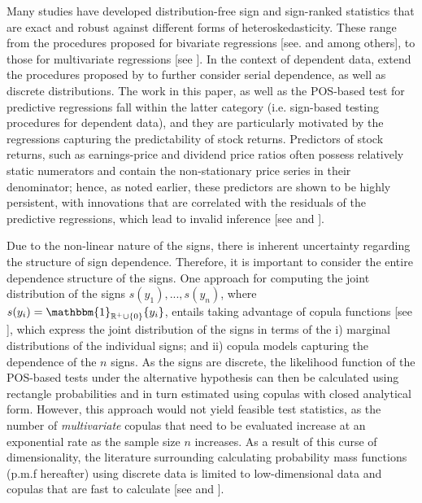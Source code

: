 \documentclass[harvard,11pt]{article}
\newcommand{\R}{\mathbb{R}}
\begin{document}
Many studies have developed distribution-free sign and sign-ranked statistics that are exact and robust against different forms of heteroskedasticity. These range from the procedures proposed for bivariate regressions [see. \citet{campbell1991over, dufour1995exact, campbell1997exact} and \citet{luger2003exact} among others], to those for multivariate regressions [see \citet{dufour2010exact}]. In the context of dependent data, \citet{coudin2009finite} extend the procedures proposed by \citet{boldin1997sign} to further consider serial dependence, as well as discrete distributions. The work in this paper, as well as the POS-based test for predictive regressions fall within the latter category (i.e. sign-based testing procedures for dependent data), and they are particularly motivated by the regressions capturing the predictability of stock returns. Predictors of stock returns, such as earnings-price and dividend price ratios often possess relatively static numerators and contain the non-stationary price series in their denominator; hence, as noted earlier, these predictors are shown to be highly persistent, with innovations that are correlated with the residuals of the predictive regressions, which lead to invalid inference [see \citet{mankiw1986we} and \citet{stambaugh1985bias,stambaugh1999predictive}]. 

Due to the non-linear nature of the signs, there is inherent uncertainty regarding the structure of sign dependence. Therefore, it is important to consider the entire dependence structure of the signs. One approach for computing the joint distribution of the signs $s(y_1),...,s(y_n)$, where $s(y_i)=\mathbbm{1}_{\R^+ \cup\{0\} }\{y_i\}$, entails taking advantage of copula functions [see \citet{sklar1959fonctions}], which express the joint distribution of the signs in terms of the i) marginal distributions of the individual signs; and ii) copula models capturing the dependence of the $n$ signs. As the signs are discrete, the likelihood function of the POS-based tests under the alternative hypothesis can then be calculated using rectangle probabilities and in turn estimated using copulas with closed analytical form. However, this approach would not yield feasible test statistics, as the number of \textit{multivariate} copulas that need to be evaluated increase at an exponential rate as the sample size $n$ increases. As a result of this curse of dimensionality, the literature surrounding calculating probability mass functions (p.m.f hereafter) using discrete data is limited to low-dimensional data and copulas that are fast to calculate [see \citet{nikoloulopoulos2008multivariate,nikoloulopoulos2009finite} and \citet{li2010two}]. 
\end{document}
